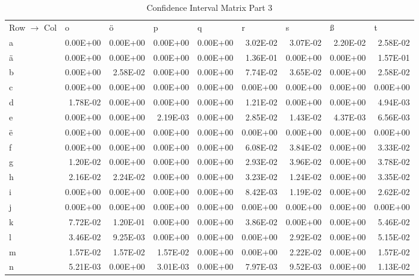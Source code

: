 \documentclass[11pt,a4paper]{CLabBookTemplate} %
\begin{document}
\begin{table}[htbp]
	\centering
	\caption{Confidence Interval Matrix Part 3}
	\begin{tabular}{lrrrrrrrr}
		Row $\rightarrow$ Col & \multicolumn{1}{l}{o} & \multicolumn{1}{l}{ö} & \multicolumn{1}{l}{p} & \multicolumn{1}{l}{q} & \multicolumn{1}{l}{r} & \multicolumn{1}{l}{s} & \multicolumn{1}{l}{ß} & \multicolumn{1}{l}{t} \\
		a     & 0.00E+00 & 0.00E+00 & 0.00E+00 & 0.00E+00 & 3.02E-02 & 3.07E-02 & 2.20E-02 & 2.58E-02 \\
		ä     & 0.00E+00 & 0.00E+00 & 0.00E+00 & 0.00E+00 & 1.36E-01 & 0.00E+00 & 0.00E+00 & 1.57E-01 \\
		b     & 0.00E+00 & 2.58E-02 & 0.00E+00 & 0.00E+00 & 7.74E-02 & 3.65E-02 & 0.00E+00 & 2.58E-02 \\
		c     & 0.00E+00 & 0.00E+00 & 0.00E+00 & 0.00E+00 & 0.00E+00 & 0.00E+00 & 0.00E+00 & 0.00E+00 \\
		d     & 1.78E-02 & 0.00E+00 & 0.00E+00 & 0.00E+00 & 1.21E-02 & 0.00E+00 & 0.00E+00 & 4.94E-03 \\
		e     & 0.00E+00 & 0.00E+00 & 2.19E-03 & 0.00E+00 & 2.85E-02 & 1.43E-02 & 4.37E-03 & 6.56E-03 \\
		ë     & 0.00E+00 & 0.00E+00 & 0.00E+00 & 0.00E+00 & 0.00E+00 & 0.00E+00 & 0.00E+00 & 0.00E+00 \\
		f     & 0.00E+00 & 0.00E+00 & 0.00E+00 & 0.00E+00 & 6.08E-02 & 3.84E-02 & 0.00E+00 & 3.33E-02 \\
		g     & 1.20E-02 & 0.00E+00 & 0.00E+00 & 0.00E+00 & 2.93E-02 & 3.96E-02 & 0.00E+00 & 3.78E-02 \\
		h     & 2.16E-02 & 2.24E-02 & 0.00E+00 & 0.00E+00 & 3.23E-02 & 1.24E-02 & 0.00E+00 & 3.35E-02 \\
		i     & 0.00E+00 & 0.00E+00 & 0.00E+00 & 0.00E+00 & 8.42E-03 & 1.19E-02 & 0.00E+00 & 2.62E-02 \\
		j     & 0.00E+00 & 0.00E+00 & 0.00E+00 & 0.00E+00 & 0.00E+00 & 0.00E+00 & 0.00E+00 & 0.00E+00 \\
		k     & 7.72E-02 & 1.20E-01 & 0.00E+00 & 0.00E+00 & 3.86E-02 & 0.00E+00 & 0.00E+00 & 5.46E-02 \\
		l     & 3.46E-02 & 9.25E-03 & 0.00E+00 & 0.00E+00 & 0.00E+00 & 2.92E-02 & 0.00E+00 & 5.15E-02 \\
		m     & 1.57E-02 & 1.57E-02 & 1.57E-02 & 0.00E+00 & 0.00E+00 & 2.22E-02 & 0.00E+00 & 1.57E-02 \\
		n     & 5.21E-03 & 0.00E+00 & 3.01E-03 & 0.00E+00 & 7.97E-03 & 9.52E-03 & 0.00E+00 & 1.13E-02 \\

\end{tabular}
\end{table}
\end{document}

